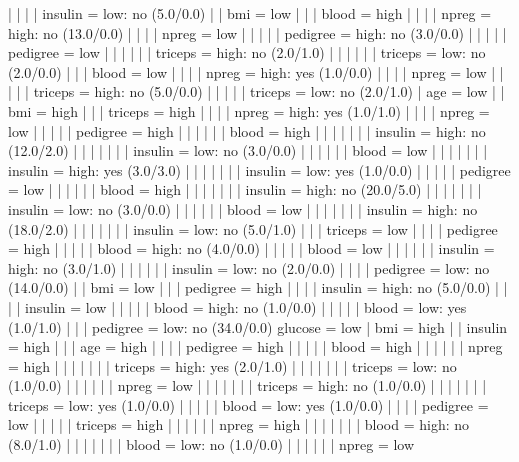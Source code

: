 |   |   |   |   insulin = low: no (5.0/0.0)
|   |   bmi = low
|   |   |   blood = high
|   |   |   |   npreg = high: no (13.0/0.0)
|   |   |   |   npreg = low
|   |   |   |   |   pedigree = high: no (3.0/0.0)
|   |   |   |   |   pedigree = low
|   |   |   |   |   |   triceps = high: no (2.0/1.0)
|   |   |   |   |   |   triceps = low: no (2.0/0.0)
|   |   |   blood = low
|   |   |   |   npreg = high: yes (1.0/0.0)
|   |   |   |   npreg = low
|   |   |   |   |   triceps = high: no (5.0/0.0)
|   |   |   |   |   triceps = low: no (2.0/1.0)
|   age = low
|   |   bmi = high
|   |   |   triceps = high
|   |   |   |   npreg = high: yes (1.0/1.0)
|   |   |   |   npreg = low
|   |   |   |   |   pedigree = high
|   |   |   |   |   |   blood = high
|   |   |   |   |   |   |   insulin = high: no (12.0/2.0)
|   |   |   |   |   |   |   insulin = low: no (3.0/0.0)
|   |   |   |   |   |   blood = low
|   |   |   |   |   |   |   insulin = high: yes (3.0/3.0)
|   |   |   |   |   |   |   insulin = low: yes (1.0/0.0)
|   |   |   |   |   pedigree = low
|   |   |   |   |   |   blood = high
|   |   |   |   |   |   |   insulin = high: no (20.0/5.0)
|   |   |   |   |   |   |   insulin = low: no (3.0/0.0)
|   |   |   |   |   |   blood = low
|   |   |   |   |   |   |   insulin = high: no (18.0/2.0)
|   |   |   |   |   |   |   insulin = low: no (5.0/1.0)
|   |   |   triceps = low
|   |   |   |   pedigree = high
|   |   |   |   |   blood = high: no (4.0/0.0)
|   |   |   |   |   blood = low
|   |   |   |   |   |   insulin = high: no (3.0/1.0)
|   |   |   |   |   |   insulin = low: no (2.0/0.0)
|   |   |   |   pedigree = low: no (14.0/0.0)
|   |   bmi = low
|   |   |   pedigree = high
|   |   |   |   insulin = high: no (5.0/0.0)
|   |   |   |   insulin = low
|   |   |   |   |   blood = high: no (1.0/0.0)
|   |   |   |   |   blood = low: yes (1.0/1.0)
|   |   |   pedigree = low: no (34.0/0.0)
glucose = low
|   bmi = high
|   |   insulin = high
|   |   |   age = high
|   |   |   |   pedigree = high
|   |   |   |   |   blood = high
|   |   |   |   |   |   npreg = high
|   |   |   |   |   |   |   triceps = high: yes (2.0/1.0)
|   |   |   |   |   |   |   triceps = low: no (1.0/0.0)
|   |   |   |   |   |   npreg = low
|   |   |   |   |   |   |   triceps = high: no (1.0/0.0)
|   |   |   |   |   |   |   triceps = low: yes (1.0/0.0)
|   |   |   |   |   blood = low: yes (1.0/0.0)
|   |   |   |   pedigree = low
|   |   |   |   |   triceps = high
|   |   |   |   |   |   npreg = high
|   |   |   |   |   |   |   blood = high: no (8.0/1.0)
|   |   |   |   |   |   |   blood = low: no (1.0/0.0)
|   |   |   |   |   |   npreg = low
